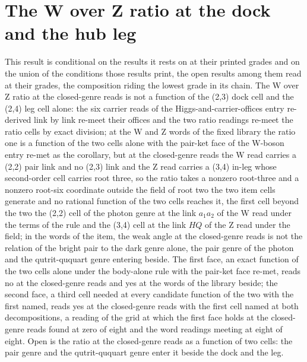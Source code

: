 \section{The W over Z ratio at the dock and the hub leg}\label{mod:VI-2-D540739-w-wzdk}
\begin{chwall}\label{box:VI-2-D540739-w-wzdk:1}
This result is conditional on the results it rests on at their printed grades and on the union of the conditions those results print, the open results among them read at their grades, the composition riding the lowest grade in its chain. The W over Z ratio at the closed-genre reads is not a function of the (2,3) dock cell and the (2,4) leg cell alone: the six carrier reads of the Higgs-and-carrier-offices entry re-derived link by link re-meet their offices and the two ratio readings re-meet the ratio cells by exact division; at the W and Z words of the fixed library the ratio one is a function of the two cells alone with the pair-ket face of the W-boson entry re-met as the corollary, but at the closed-genre reads the W read carries a (2,2) pair link and no (2,3) link and the Z read carries a (3,4) in-leg whose second-order cell carries root three, so the ratio takes a nonzero root-three and a nonzero root-six coordinate outside the field of root two the two item cells generate and no rational function of the two cells reaches it, the first cell beyond the two the (2,2) cell of the photon genre at the link $a_{1}a_{2}$ of the W read under the terms of the rule and the (3,4) cell at the link $HQ$ of the Z read under the field; in the words of the item, the weak angle at the closed-genre reads is not the relation of the bright pair to the dark genre alone, the pair genre of the photon and the qutrit-ququart genre entering beside.
The first face, an exact function of the two cells alone under the body-alone rule with the pair-ket face re-met, reads no at the closed-genre reads and yes at the words of the library beside; the second face, a third cell needed at every candidate function of the two with the first named, reads yes at the closed-genre reads with the first cell named at both decompositions, a reading of the grid at which the first face holds at the closed-genre reads found at zero of eight and the word readings meeting at eight of eight. Open is the ratio at the closed-genre reads as a function of two cells: the pair genre and the qutrit-ququart genre enter it beside the dock and the leg.
\end{chwall}
